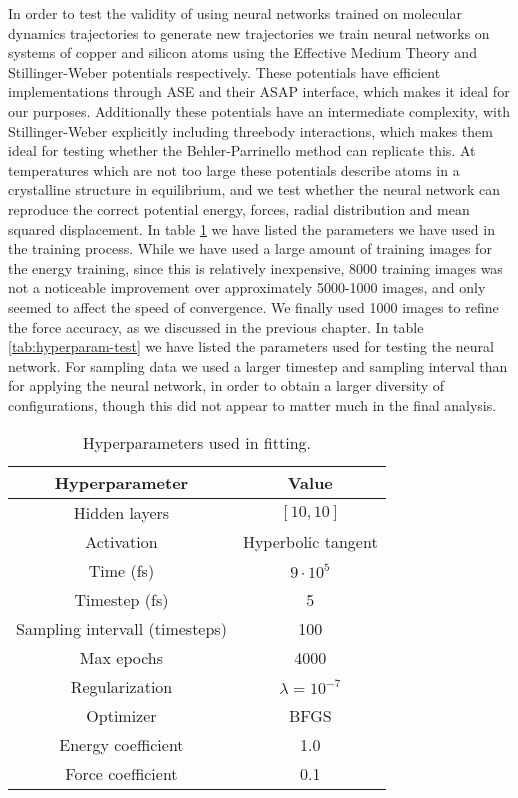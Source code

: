 In order to test the validity of using neural networks trained
on molecular dynamics trajectories to generate new trajectories
we train neural networks on systems of copper and silicon atoms
using the Effective Medium Theory and Stillinger-Weber potentials
respectively.
These potentials have efficient implementations
through ASE and their ASAP interface, which makes
it ideal for our purposes. Additionally these potentials
have an intermediate complexity, with Stillinger-Weber explicitly
including threebody interactions, which makes them ideal
for testing whether the Behler-Parrinello method can replicate this.
At temperatures which are not too large these potentials describe
atoms in a crystalline structure in equilibrium,
and we test whether the neural network can reproduce the correct potential
energy, forces, radial distribution and mean squared displacement.
In table \ref{tab:hyperparam} we have listed the parameters we have
used in the training process. While we have used a large amount
of training images for the energy training, since this is relatively
inexpensive, 8000 training images was not a noticeable improvement
over approximately 5000-1000 images,
and only seemed to affect the speed of convergence.
We finally used 1000 images to refine the force accuracy,
as we discussed in the previous chapter.
In table \ref{tab:hyperparam-test} we have listed the parameters
used for testing the neural network. For sampling data we used a larger
timestep and sampling interval
than for applying the neural network, in order to obtain
a larger diversity of configurations, though this did not appear to
matter much in the final analysis.


\begin{table}[H]
\centering
\begin{tabular}{|c c|}
\hline
Hyperparameter & Value \\
\hline \hline
    Hidden layers & $\left[10, 10\right]$ \\
Activation & Hyperbolic tangent \\
    Time (fs) & $9 \cdot 10^5$ \\
    Timestep (fs) & 5 \\
    Sampling intervall (timesteps) & 100 \\
Max epochs & 4000 \\
    Regularization & $\lambda = 10^{-7}$ \\
Optimizer & BFGS \\
Energy coefficient & 1.0 \\
Force coefficient & 0.1 \\
\hline
\end{tabular}
\caption{Hyperparameters used in fitting.}
\label{tab:hyperparam}
\end{table}

